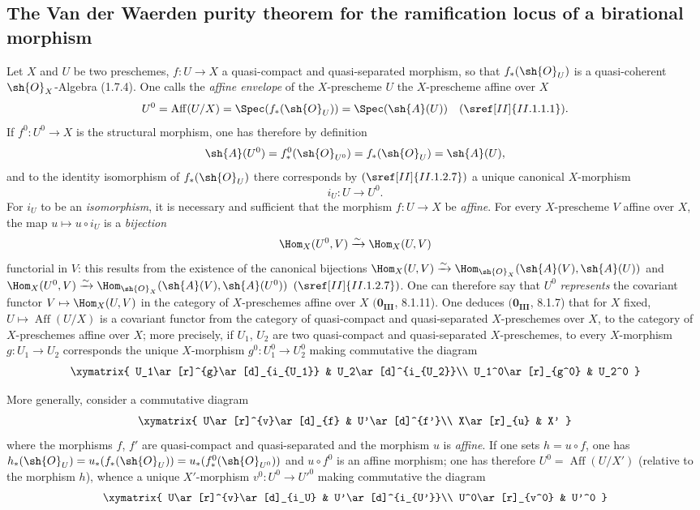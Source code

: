 \subsection{The Van der Waerden purity theorem for the ramification locus of a birational morphism}
\label{IV.21.12}


\begin{env}[21.12.1]
\label{IV.21.12.1}
Let $X$ and $U$ be two preschemes, $f:U\to X$ a quasi-compact and quasi-separated morphism, so that $f_*(\sh{O}_U)$ is a quasi-coherent $\sh{O}_X$-Algebra (1.7.4).
One calls the \emph{affine envelope} of the $X$-prescheme $U$ the $X$-prescheme affine over $X$
\[
  U^0=\operatorname{Aff}(U/X)=\Spec(f_*(\sh{O}_U))=\Spec(\sh{A}(U))\quad(\sref[II]{II.1.1.1}).
\]
If $f^0:U^0\to X$ is the structural morphism, one has therefore by definition
\[
  \sh{A}(U^0)=f_*^0(\sh{O}_{U^0})=f_*(\sh{O}_U)=\sh{A}(U),
\]
and to the identity isomorphism of $f_*(\sh{O}_U)$ there corresponds by $(\sref[II]{II.1.2.7})$ a unique canonical $X$-morphism
\[
\label{IV.21.12.1.1}
  i_U:U\to U^0.
  \tag{21.12.1.1}
\]
For $i_U$ to be an \emph{isomorphism}, it is necessary and sufficient that the morphism $f:U\to X$ be \emph{affine}.
For every $X$-prescheme $V$ affine over $X$, the map $u\mapsto u\circ i_U$ is a \emph{bijection}
\[
  \Hom_X(U^0,V)\xrightarrow{\sim}\Hom_X(U,V)
\]
functorial in $V$:
this results from the existence of the canonical bijections
$\Hom_X(U,V)\xrightarrow{\sim}\Hom_{\sh{O}_X}(\sh{A}(V),\sh{A}(U))$
and $\Hom_X(U^0,V)\xrightarrow{\sim}\Hom_{\sh{O}_X}(\sh{A}(V),\sh{A}(U^0))$ $(\sref[II]{II.1.2.7})$.
One can therefore say that $U^0$ \emph{represents} the covariant functor $V\mapsto\Hom_X(U,V)$ in the category of $X$-preschemes affine over $X$ $(\mathbf{0_{III}}$, 8.1.11).
One deduces $(\mathbf{0_{III}}$, 8.1.7) that for $X$ fixed, $U\mapsto\operatorname{Aff}(U/X)$ is a covariant functor from the category of quasi-compact and quasi-separated $X$-preschemes over $X$, to the category of $X$-preschemes affine over $X$;
more precisely, if $U_1$, $U_2$ are two quasi-compact and quasi-separated $X$-preschemes, to every $X$-morphism $g:U_1\to U_2$ corresponds the unique $X$-morphism $g^0:U_1^0\to U_2^0$ making commutative the diagram
\[
  \xymatrix{
    U_1\ar[r]^{g}\ar[d]_{i_{U_1}} & U_2\ar[d]^{i_{U_2}}\\
    U_1^0\ar[r]_{g^0} & U_2^0
  }
\]


More generally, consider a commutative diagram
\[
  \xymatrix{
    U\ar[r]^{v}\ar[d]_{f} & U'\ar[d]^{f'}\\
    X\ar[r]_{u} & X'
  }
\]
where the morphisms $f$, $f'$ are quasi-compact and quasi-separated and the morphism $u$ is \emph{affine}.
If one sets $h=u\circ f$, one has $h_*(\sh{O}_U)=u_*(f_*(\sh{O}_U))=u_*(f_*^0(\sh{O}_{U^0}))$ and $u\circ f^0$ is an affine morphism;
one has therefore $U^0=\operatorname{Aff}(U/X')$ (relative to the morphism $h$), whence a unique $X'$-morphism $v^0:U^0\to U'^0$ making commutative the diagram
\[
  \xymatrix{
    U\ar[r]^{v}\ar[d]_{i_U} & U'\ar[d]^{i_{U'}}\\
    U^0\ar[r]_{v^0} & U'^0
  }
\]
\end{env}

